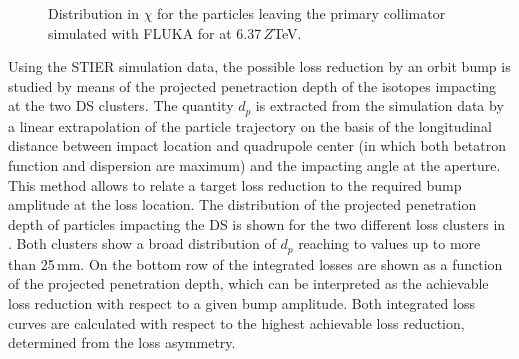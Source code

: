 \begin{figure}[htbp]
  \centering
  \caption{Distribution in $\chi$ for the particles leaving the primary collimator simulated with FLUKA for \lead at 6.37$\,Z$TeV.}  
  \label{pic:16061608}
  \end{figure}

Using the STIER simulation data, the possible loss reduction by an orbit bump is studied by means of the projected penetraction depth of the isotopes impacting at the two DS clusters. The quantity $d_p$ is extracted from the simulation data by a linear extrapolation of the particle trajectory on the basis of the longitudinal distance between impact location and quadrupole center (in which both betatron function and dispersion are maximum) and the impacting angle at the aperture. This method allows to relate a target loss reduction to the required bump amplitude at the loss location. The distribution of the projected penetration depth of particles impacting the DS is shown for the two different loss clusters in . Both clusters show a broad distribution of $d_p$ reaching to values up to more than 25$\,$mm. On the bottom row of  the integrated losses are shown as a function of the projected penetration depth, which can be interpreted as the achievable loss reduction with respect to a given bump amplitude. Both integrated loss curves are calculated with respect to the highest achievable loss reduction, determined from the loss asymmetry. 





